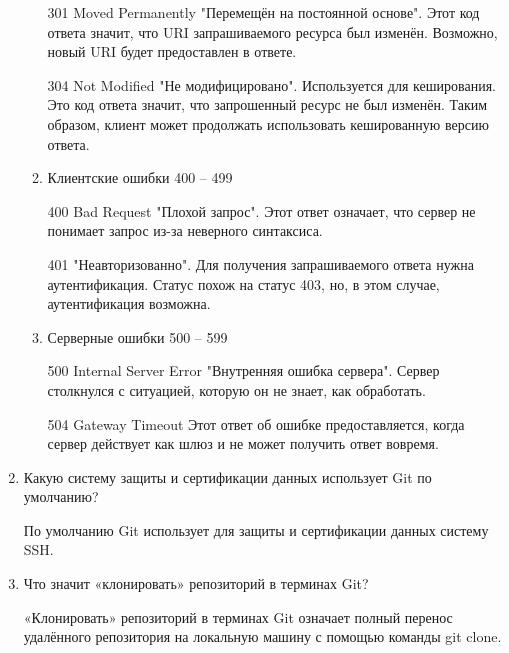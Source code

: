 \documentclass[14pt]{extarticle}
\begin{document}
\begin{enumerate}
\begin{enumerate}
301 Moved Permanently "Перемещён на постоянной основе". Этот код ответа значит, что URI запрашиваемого ресурса был изменён. Возможно, новый URI будет предоставлен в ответе.

304 Not Modified "Не модифицировано". Используется для кеширования. Это код ответа значит, что запрошенный ресурс не был изменён. Таким образом, клиент может продолжать использовать кешированную версию ответа.

\item Клиентские ошибки 400 – 499

400 Bad Request "Плохой запрос". Этот ответ означает, что сервер не понимает запрос из-за неверного синтаксиса.

401 "Неавторизованно". Для получения запрашиваемого ответа нужна аутентификация. Статус похож на статус 403, но, в этом случае, аутентификация возможна.

\item Серверные ошибки 500 – 599

500 Internal Server Error "Внутренняя ошибка сервера". Сервер столкнулся с ситуацией, которую он не знает, как обработать.

504 Gateway Timeout Этот ответ об ошибке предоставляется, когда сервер действует как шлюз и не может получить ответ вовремя.
\end{enumerate}

\item Какую систему защиты и сертификации данных использует Git по умолчанию?

По умолчанию Git использует для защиты и сертификации данных систему SSH.
\item Что значит «клонировать» репозиторий в терминах Git?

«Клонировать» репозиторий в терминах Git означает полный перенос удалённого репозитория на локальную машину с помощью команды git clone.
\end{enumerate}
\end{document}
